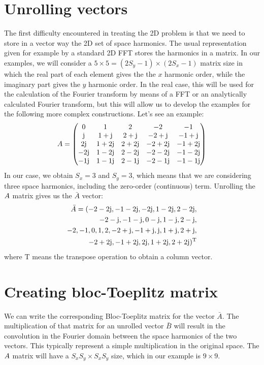 \section{Unrolling vectors}
The first difficulty encountered in treating the 2D problem is that we need to store in a vector way the 2D set of space harmonics. The usual representation given for example by a standard 2D FFT stores the harmonics in a matrix. In our examples, we will consider a $5\times 5=(2S_y-1)\times(2S_x-1)$ matrix size in which the real part of each element gives the the $x$ harmonic order, while the imaginary part gives  the  $y$ harmonic order. In the real case, this will be used for the calculation of the Fourier transform by means of a FFT or an analytically calculated Fourier transform, but this will allow us to develop the examples for the following more complex constructions. Let's see an example:
\begin{equation}
A =
\begin{pmatrix}
0		   &	1	    &	2		   &-2		    &  -1       \\
\mathrm{j}   & 1+\mathrm{j}  	&	2+\mathrm{j}   &-2+\mathrm{j}  	&-1+\mathrm{j}  \\
2\mathrm{j}  & 1+2\mathrm{j}  &	2+2\mathrm{j}  &-2+2\mathrm{j}  &-1+2\mathrm{j}  \\
-2\mathrm{j}  & 1-2\mathrm{j}  &	2-2\mathrm{j}  &-2-2\mathrm{j}  &-1-2\mathrm{j}  \\
-1\mathrm{j}  & 1-1\mathrm{j}  &	2-1\mathrm{j}  &-2-1\mathrm{j}  &-1-1\mathrm{j}  
\end{pmatrix}
\end{equation}
In our case, we obtain $S_x=3$ and $S_y=3$, which means that we are considering three space harmonics, including the zero-order (continuous) term.
Unrolling the $A$ matrix gives us the $\bar{A}$ vector:
\begin{equation}
\begin{aligned}
\bar{A}=
(-2-2\mathrm{j}, -1-2\mathrm{j}, -2\mathrm{j}, 1-2\mathrm{j}, 2-2\mathrm{j}, \\
-2-\mathrm{j}, -1-\mathrm{j}, 0-\mathrm{j}, 1-\mathrm{j}, 2-\mathrm{j}, \\
-2, -1, 0, 1, 2,
-2+\mathrm{j}, -1+\mathrm{j}, \mathrm{j}, 1+\mathrm{j}, 2+\mathrm{j}, \\
-2+2\mathrm{j}, -1+2\mathrm{j}, 2\mathrm{j}, 1+2\mathrm{j}, 2+2\mathrm{j})^\mathrm{T}
\end{aligned}
\end{equation}
where $\mathrm{T}$ means the transpose operation to obtain a column vector.

\section{Creating bloc-Toeplitz matrix}
\label{sec_block_toeplitz_examples}
We can write the corresponding Bloc-Toeplitz matrix for the vector $\bar{A}$. The multiplication of that matrix for an unrolled vector $\bar{B}$ will result in the convolution in the Fourier domain between the space harmonics of the two vectors. This typically represent a simple multiplication in the original space.
The $A$ matrix will have a $S_xS_y\times S_xS_y$ size, which in our example is $9\times 9$. 

